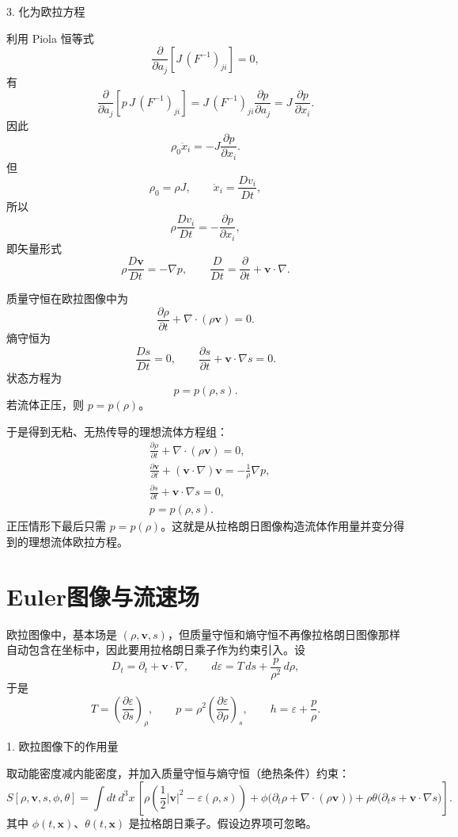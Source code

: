 \documentclass[b5paper]{book}
\begin{document}
3. 化为欧拉方程

利用 Piola 恒等式
\[
\frac{\partial}{\partial a_j}\left[J\,(F^{-1})_{ji}\right]=0,
\]
有
\[
\frac{\partial}{\partial a_j}
\left[
p\,J\,(F^{-1})_{ji}
\right]
=
J\,(F^{-1})_{ji}
\frac{\partial p}{\partial a_j}
=
J\,\frac{\partial p}{\partial x_i}.
\]
因此
\[
\rho_0 \ddot x_i=-J\frac{\partial p}{\partial x_i}.
\]
但
\[
\rho_0=\rho J,\qquad \ddot x_i=\frac{Dv_i}{Dt},
\]
所以
\[
\rho\frac{Dv_i}{Dt}=-\frac{\partial p}{\partial x_i},
\]
即矢量形式
\[
\rho\frac{D\boldsymbol v}{Dt}=-\nabla p,
\qquad
\frac{D}{Dt}=\frac{\partial}{\partial t}+\boldsymbol v\cdot\nabla.
\]

质量守恒在欧拉图像中为
\[
\frac{\partial \rho}{\partial t}+\nabla\cdot(\rho\boldsymbol v)=0.
\]
熵守恒为
\[
\frac{Ds}{Dt}=0,
\qquad
\frac{\partial s}{\partial t}+\boldsymbol v\cdot\nabla s=0.
\]
状态方程为
\[
p=p(\rho,s).
\]
若流体正压，则 \(p=p(\rho)\)。

于是得到无粘、无热传导的理想流体方程组：
\[
\boxed{
\begin{aligned}
&\frac{\partial \rho}{\partial t}+\nabla\cdot(\rho\boldsymbol v)=0,\\[2mm]
&\frac{\partial \boldsymbol v}{\partial t}+(\boldsymbol v\cdot\nabla)\boldsymbol v
=-\frac{1}{\rho}\nabla p,\\[2mm]
&\frac{\partial s}{\partial t}+\boldsymbol v\cdot\nabla s=0,\\[2mm]
&p=p(\rho,s).
\end{aligned}}
\]
正压情形下最后只需 \(p=p(\rho)\)。这就是从拉格朗日图像构造流体作用量并变分得到的理想流体欧拉方程。

\section{Euler图像与流速场}
\label{sec:euler_eq}
欧拉图像中，基本场是 \((\rho,\boldsymbol v,s)\)，但质量守恒和熵守恒不再像拉格朗日图像那样自动包含在坐标中，因此要用拉格朗日乘子作为约束引入。设
\[
D_t=\partial_t+\boldsymbol v\cdot\nabla,\qquad 
d\varepsilon=T\,ds+\frac{p}{\rho^2}\,d\rho,
\]
于是
\[
T=\left(\frac{\partial\varepsilon}{\partial s}\right)_\rho,\qquad
p=\rho^2\left(\frac{\partial\varepsilon}{\partial\rho}\right)_s,
\qquad
h=\varepsilon+\frac{p}{\rho}.
\]

 1. 欧拉图像下的作用量

取动能密度减内能密度，并加入质量守恒与熵守恒（绝热条件）约束：
\[
\boxed{
S[\rho,\boldsymbol v,s,\phi,\theta]
=
\int dt\,d^3x\,
\left[
\rho\left(\frac12|\boldsymbol v|^2-\varepsilon(\rho,s)\right)
+\phi\bigl(\partial_t\rho+\nabla\cdot(\rho\boldsymbol v)\bigr)
+\rho\theta\bigl(\partial_t s+\boldsymbol v\cdot\nabla s\bigr)
\right].
}
\]
其中 \(\phi(t,\boldsymbol x)\)、\(\theta(t,\boldsymbol x)\) 是拉格朗日乘子。假设边界项可忽略。
\end{document}
